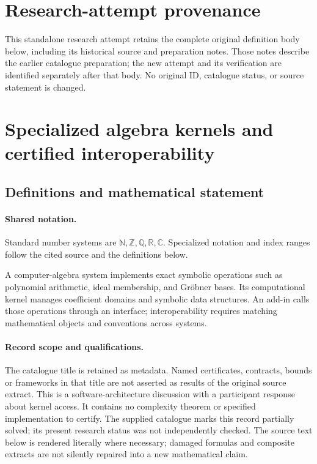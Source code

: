 \documentclass[11pt]{article}
\begin{document}
\section*{Research-attempt provenance}
This standalone research attempt retains the complete original definition body below,
including its historical source and preparation notes. Those notes describe the
earlier catalogue preparation; the new attempt and its verification are identified
separately after that body. No original ID, catalogue status, or source statement is changed.

\section{Specialized algebra kernels and certified interoperability}\label{statement}

\subsection{Definitions and mathematical statement}

\paragraph{Shared notation.}Standard number systems are $\mathbb N,\mathbb Z,\mathbb Q,\mathbb R,\mathbb C$. Specialized notation and index ranges follow the cited source and the definitions below.


A computer-algebra system implements exact symbolic operations such as polynomial arithmetic, ideal membership, and Gröbner bases. Its computational kernel manages coefficient domains and symbolic data structures. An add-in calls those operations through an interface; interoperability requires matching mathematical objects and conventions across systems.
\paragraph{Record scope and qualifications.}
The catalogue title is retained as metadata. Named certificates, contracts, bounds or frameworks in that title are not asserted as results of the original source extract.
This is a software-architecture discussion with a participant response about kernel access. It contains no complexity theorem or specified implementation to certify. The supplied catalogue marks this record partially solved; its present research status was not independently checked.
The source text below is rendered literally where necessary; damaged formulas and composite extracts are not silently repaired into a new mathematical claim.
\end{document}
